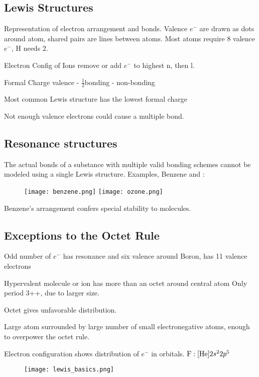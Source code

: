 \begin{mdframed}
\subsection{Lewis Structures}
\begin{multicols}{2}
\begin{compactdesc}
\item[Representation] of electron arrangement and bonds. Valence $e^-$ are
    drawn as dots around atom, shared pairs are lines between atoms.
    Most atoms require 8 valence $e^-$, H needs 2.
\item[Electron Config of Ions] remove or add $e^-$ to highest n, then l.
\item[Formal Charge] valence - $\frac{1}{2}$bonding - non-bonding
\item[Most common Lewis structure] has the lowest formal charge
\item[Not enough valence] electrons could cause a multiple bond.
\end{compactdesc}

\subsection{Resonance structures}
The actual bonds of a substance with multiple valid bonding schemes cannot be
modeled using a single Lewis structure. Examples, Benzene and :
\begin{figure}[H]
    \centering
    \texttt{[image: benzene.png]}
    \texttt{[image: ozone.png]}
\end{figure}


Benzene's arrangement confers special stability to molecules.

\subsection{Exceptions to the Octet Rule}
\begin{compactdesc}
\item[Odd number of $e^-$]  has resonance and six valence around Boron,
     has 11 valence electrons
\item[Hypervalent] molecule or ion has more than an octet around central atom
    Only period 3++, due to larger size.
\item[Octet gives unfavorable] distribution.
\item[Large atom] surrounded by large number of small electronegative atoms,
    enough to overpower the octet rule.
\item[Electron configuration] shows distribution of $e^-$ in orbitals.
    $\ce{F}: [\ce{He}] 2s^2 2p^5$
\end{compactdesc}

\begin{figure}[H]
    \centering
    \texttt{[image: lewis\_basics.png]}
\end{figure}

\end{multicols}
\end{mdframed}



